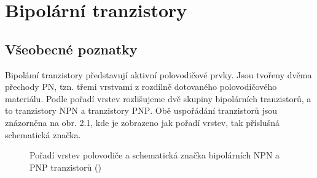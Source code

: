 \setchaptertoc
\chapter{Bipolární tranzistory}\label{es:IchapV}
  \section{Všeobecné poznatky}
    Bipolámí tranzistory představují aktivní polovodičové prvky. Jsou tvořeny dvěma přechody PN,
    tzn. třemi vrstvami z rozdílně dotovaného polovodičového materiálu. Podle pořadí vrstev
    rozlišujeme dvě skupiny bipolárních tranzistorů, a to tranzistory \textsc{NPN} a tranzistory
    \textsc{PNP}. Obě uspořádání tranzistorů jsou znázorněna na obr. 2.1, kde je zobrazeno jak
    pořadí vrstev, tak příslušná schematická značka.

    \begin{figure}[ht!]
      \centering  
          \hspace{1em}
          \newline
          \hspace{1em}
      \caption{Pořadí vrstev polovodiče a schematická značka bipolárních NPN a PNP 
      tranzistorů (\cite[s.~112]{Frohn2006})}
      \label{teo:fig053}
    \end{figure}
